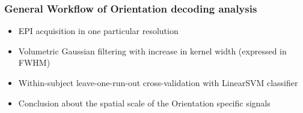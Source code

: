 \documentclass{beamer}
\begin{document}
  \begin{frame}
    \frametitle{General Workflow of Orientation decoding analysis}
        \begin{itemize}
            \item EPI acquisition in one particular resolution
            \item Volumetric Gaussian filtering with increase in kernel width (expressed in FWHM)
            \item Within-subject leave-one-run-out cross-validation with LinearSVM classifier
            \item Conclusion about the spatial scale of the Orientation specific signals 
        \end{itemize}  
    \end{frame}

\end{document}
